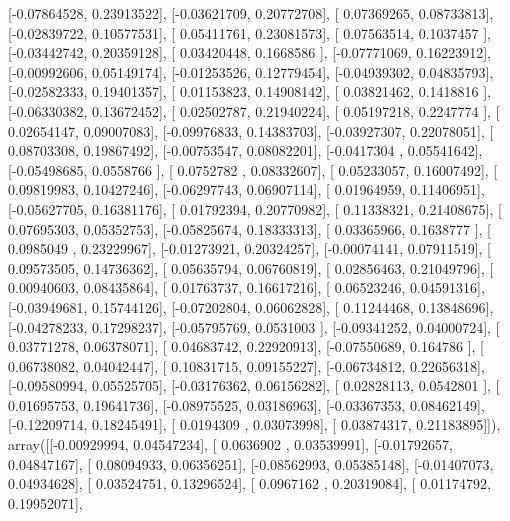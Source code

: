 \documentclass{article}
\begin{document}
       [-0.07864528,  0.23913522],
       [-0.03621709,  0.20772708],
       [ 0.07369265,  0.08733813],
       [-0.02839722,  0.10577531],
       [ 0.05411761,  0.23081573],
       [ 0.07563514,  0.1037457 ],
       [-0.03442742,  0.20359128],
       [ 0.03420448,  0.1668586 ],
       [-0.07771069,  0.16223912],
       [-0.00992606,  0.05149174],
       [-0.01253526,  0.12779454],
       [-0.04939302,  0.04835793],
       [-0.02582333,  0.19401357],
       [ 0.01153823,  0.14908142],
       [ 0.03821462,  0.1418816 ],
       [-0.06330382,  0.13672452],
       [ 0.02502787,  0.21940224],
       [ 0.05197218,  0.2247774 ],
       [ 0.02654147,  0.09007083],
       [-0.09976833,  0.14383703],
       [-0.03927307,  0.22078051],
       [ 0.08703308,  0.19867492],
       [-0.00753547,  0.08082201],
       [-0.0417304 ,  0.05541642],
       [-0.05498685,  0.0558766 ],
       [ 0.0752782 ,  0.08332607],
       [ 0.05233057,  0.16007492],
       [ 0.09819983,  0.10427246],
       [-0.06297743,  0.06907114],
       [ 0.01964959,  0.11406951],
       [-0.05627705,  0.16381176],
       [ 0.01792394,  0.20770982],
       [ 0.11338321,  0.21408675],
       [ 0.07695303,  0.05352753],
       [-0.05825674,  0.18333313],
       [ 0.03365966,  0.1638777 ],
       [ 0.0985049 ,  0.23229967],
       [-0.01273921,  0.20324257],
       [-0.00074141,  0.07911519],
       [ 0.09573505,  0.14736362],
       [ 0.05635794,  0.06760819],
       [ 0.02856463,  0.21049796],
       [ 0.00940603,  0.08435864],
       [ 0.01763737,  0.16617216],
       [ 0.06523246,  0.04591316],
       [-0.03949681,  0.15744126],
       [-0.07202804,  0.06062828],
       [ 0.11244468,  0.13848696],
       [-0.04278233,  0.17298237],
       [-0.05795769,  0.0531003 ],
       [-0.09341252,  0.04000724],
       [ 0.03771278,  0.06378071],
       [ 0.04683742,  0.22920913],
       [-0.07550689,  0.164786  ],
       [ 0.06738082,  0.04042447],
       [ 0.10831715,  0.09155227],
       [-0.06734812,  0.22656318],
       [-0.09580994,  0.05525705],
       [-0.03176362,  0.06156282],
       [ 0.02828113,  0.0542801 ],
       [ 0.01695753,  0.19641736],
       [-0.08975525,  0.03186963],
       [-0.03367353,  0.08462149],
       [-0.12209714,  0.18245491],
       [ 0.0194309 ,  0.03073998],
       [ 0.03874317,  0.21183895]]), array([[-0.00929994,  0.04547234],
       [ 0.0636902 ,  0.03539991],
       [-0.01792657,  0.04847167],
       [ 0.08094933,  0.06356251],
       [-0.08562993,  0.05385148],
       [-0.01407073,  0.04934628],
       [ 0.03524751,  0.13296524],
       [ 0.0967162 ,  0.20319084],
       [ 0.01174792,  0.19952071],
\end{document}
